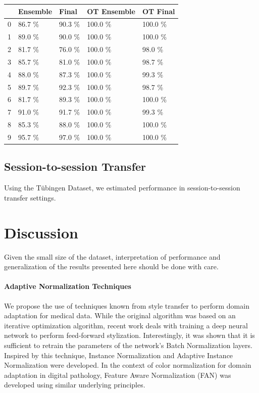 \documentclass[10pt,a4paper]{article}
\begin{document}
\begin{table}
\begin{tabular}{lllll}
\toprule
{} & Ensemble &  Final & OT Ensemble & OT Final \\
\midrule
0 &   86.7 \% & 90.3 \% &     100.0 \% &  100.0 \% \\
1 &   89.0 \% & 90.0 \% &     100.0 \% &  100.0 \% \\
2 &   81.7 \% & 76.0 \% &     100.0 \% &   98.0 \% \\
3 &   85.7 \% & 81.0 \% &     100.0 \% &   98.7 \% \\
4 &   88.0 \% & 87.3 \% &     100.0 \% &   99.3 \% \\
5 &   89.7 \% & 92.3 \% &     100.0 \% &   98.7 \% \\
6 &   81.7 \% & 89.3 \% &     100.0 \% &  100.0 \% \\
7 &   91.0 \% & 91.7 \% &     100.0 \% &   99.3 \% \\
8 &   85.3 \% & 88.0 \% &     100.0 \% &  100.0 \% \\
9 &   95.7 \% & 97.0 \% &     100.0 \% &  100.0 \% \\
\bottomrule
\end{tabular}
\end{table}

\subsection{Session-to-session Transfer}
Using the Tübingen Dataset, we estimated performance in session-to-session transfer settings.

\section{Discussion}

Given the small size of the dataset, interpretation of performance and generalization of the results presented here should be done with care.


\paragraph{Adaptive Normalization Techniques}

We propose the use of techniques known from style transfer \cite{Gatys2016} to perform domain adaptation for medical data.
While the original algorithm was based on an iterative optimization algorithm, recent work deals with training a deep neural network to perform feed-forward stylization.
Interestingly, it was shown that it is sufficient to retrain the parameters of the network's Batch Normalization \cite{Ioffe2015} layers.
Inspired by this technique, Instance Normalization \cite{Ulyanov2016} and Adaptive Instance Normalization \cite{Huang2017} were developed.
In the context of color normalization for domain adaptation in digital pathology, Feature Aware Normalization (FAN) \cite{Bug2017} was developed using similar underlying principles.
\end{document}
